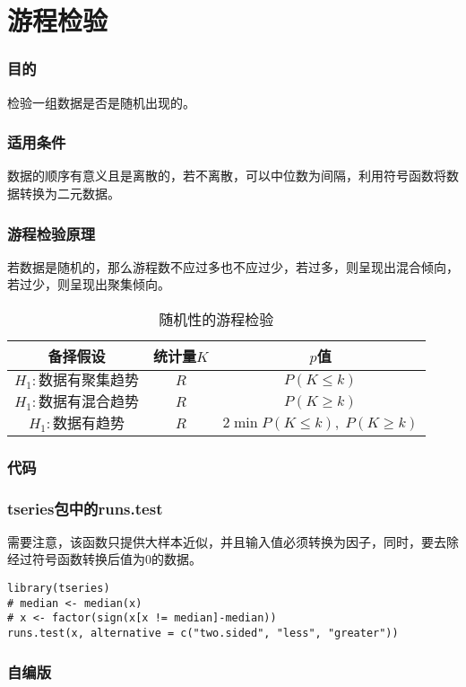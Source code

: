 \section{游程检验}

\subsubsection{目的}
检验一组数据是否是随机出现的。
\subsubsection{适用条件}
数据的顺序有意义且是离散的，若不离散，可以中位数为间隔，利用符号函数将数据转换为二元数据。
\subsubsection{游程检验原理}
若数据是随机的，那么游程数不应过多也不应过少，若过多，则呈现出混合倾向，若过少，则呈现出聚集倾向。

\begin{table}[htbp]
	\centering
	\begin{tabular}{ccc}
		\toprule
		备择假设 & 统计量$K$ & $p$值 \\
		\midrule 
		$H_1:\text{数据有聚集趋势}$ & $R$ & $P(K\leqslant k)$ \\
		$H_1:\text{数据有混合趋势}$ & $R$ & $P(K\geqslant k)$ \\
		$H_1:\text{数据有趋势}$ & $R$ & $2\min{P(K\leqslant k),\;P(K\geqslant k)}$ \\
		\bottomrule 
	\end{tabular}
	\caption{随机性的游程检验}
\end{table}
\subsubsection{代码}
\subsubsection{tseries包中的runs.test}
需要注意，该函数只提供大样本近似，并且输入值必须转换为因子，同时，要去除经过符号函数转换后值为$0$的数据。
\begin{verbatim}
library(tseries)
# median <- median(x)
# x <- factor(sign(x[x != median]-median))
runs.test(x, alternative = c("two.sided", "less", "greater"))
\end{verbatim}
\subsubsection{自编版}
\inputminted[bgcolor=white, linenos, frame=single, numbersep=5pt, breaklines]{r}{nonparametric-statistics/chapter4/runs-test.R}
